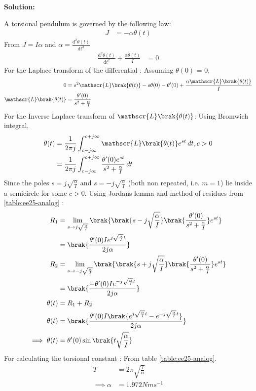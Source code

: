 \documentclass[journal,12pt,onecolumn]{IEEEtran}
\theoremstyle{remark}
\begin{document}
\textbf{Solution:}
\fi
    
A torsional pendulum is governed by the following law:
\begin{align}
    J &= -\alpha\theta(t) 
\end{align}
From $J = I\alpha$ and $\alpha = \frac{\mathrm{d}^2 \theta(t)}{\mathrm{d}t^2}$
\begin{align}
\frac{\mathrm{d}^2 \theta(t)}{\mathrm{d}t^2} + \frac{\alpha\theta(t)}{I} &= 0
\end{align}
For the Laplace transform of the differential : 
Assuming $\theta(0)$ = 0,
\begin{align}
0 &= s^2\mathscr{L}\brak{\theta(t)} - s\theta(0) - \theta'(0) + \frac{\alpha\mathscr{L}\brak{\theta(t)}}{I}\\
\mathscr{L}\brak{\theta(t)} &= \frac{\theta'(0)}{s^2+\frac{\alpha}{I}}
    \end{align}
For the Inverse Laplace transform of $\mathscr{L}\brak{\theta(t)}$: Using Bromwich integral,
\begin{align}
 \theta(t) &= \frac{1}{2\pi j}\int_{c-j\infty}^{c+j\infty}\mathscr{L}\brak{\theta(t)}e^{st}\,dt , c > 0\\
 &= \frac{1}{2\pi j}\int_{c-j\infty}^{c+j\infty}\frac{\theta'(0)e^{st}}{s^2+\frac{\alpha}{I}}\,dt
\end{align}
Since the poles $s=j\sqrt{\frac{\alpha}{I}}$ and $s=-j\sqrt{\frac{\alpha}{I}}$ (both non repeated, i.e. $m=1$) lie inside a semicircle for some $c>0$. Using Jordans lemma and method of residues from \ref{table:ee25-analog} :
\begin{align}
      R_1&=\lim\limits_{s\to j\sqrt{\frac{\alpha}{I}}}\brak {{\brak{s-j\sqrt{\frac{\alpha}{I}}}}\brak{\frac{\theta'(0)}{s^2+\frac{\alpha}{I}}} e^{st}}\\
&={\brak{\frac{\theta'(0)Ie^{j\sqrt{\frac{\alpha}{I}}t}}{2j\alpha}}}\\
  R_2&=\lim\limits_{s\to -j\sqrt{\frac{\alpha}{I}}}\brak {{\brak{s+j\sqrt{\frac{\alpha}{I}}}}\brak{\frac{\theta'(0)}{s^2+\frac{\alpha}{I}}} e^{st}}\\
&={\brak{\frac{-\theta'(0)Ie^{-j\sqrt{\frac{\alpha}{I}}t}}{2j\alpha}}}\\
\theta(t) &= R_1 + R_2\\
\theta(t) &= {\brak{\frac{\theta'(0)I\brak{e^{j\sqrt{\frac{\alpha}{I}}t}-e^{-j\sqrt{\frac{\alpha}{I}}t}}}{2j\alpha}}}\\
\implies
\theta(t) &=\theta'(0)\sin{\brak{t\sqrt{\frac{\alpha}{I}}}}
\end{align}
For calculating the torsional constant :
From table \ref{table:ee25-analog}.
\begin{align}
 T &= 2\pi\sqrt{\frac{I}{\alpha}}\\
\implies \alpha &= 1.972 Nms^{-1}
\end{align}
\end{document}
